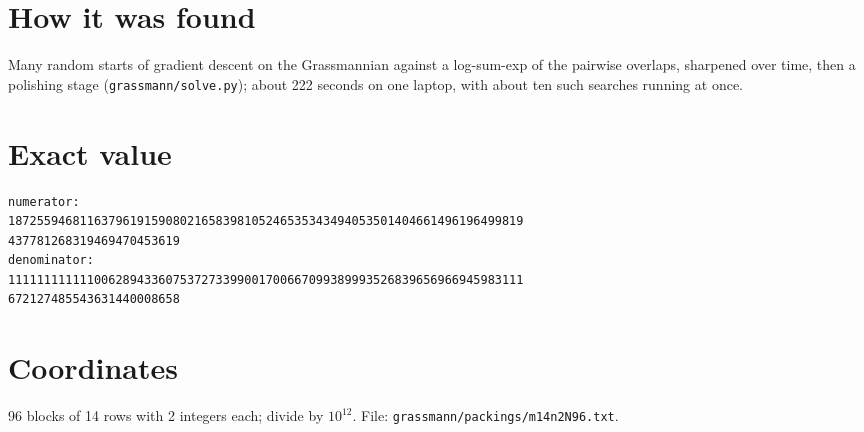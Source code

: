 \documentclass[11pt,a4paper]{article}
\begin{document}
\section{How it was found}
Many random starts of gradient descent on the Grassmannian against a log-sum-exp of the pairwise overlaps, sharpened over time, then a polishing stage (\texttt{grassmann/solve.py}); about 222 seconds on one laptop, with about ten such searches running at once.


\appendix
\section{Exact value}
{\small
\begin{verbatim}
numerator:
187255946811637961915908021658398105246535343494053501404661496196499819
437781268319469470453619
denominator:
111111111111006289433607537273399001700667099389993526839656966945983111
672127485543631440008658
\end{verbatim}}

\section{Coordinates}
96 blocks of 14 rows with 2 integers each; divide by $10^{12}$. File: \texttt{grassmann/packings/m14n2N96.txt}.
{\tiny
\begin{multicols}{4}
\end{multicols}}
\end{document}

